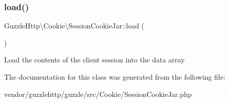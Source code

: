 \subsubsection{\texorpdfstring{load()}{load()}}
{\footnotesize\ttfamily Guzzle\+Http\textbackslash{}\+Cookie\textbackslash{}\+Session\+Cookie\+Jar\+::load (\begin{DoxyParamCaption}{ }\end{DoxyParamCaption})\hspace{0.3cm}{\ttfamily [protected]}}

Load the contents of the client session into the data array 

The documentation for this class was generated from the following file\+:\begin{DoxyCompactItemize}
\item 
vendor/guzzlehttp/guzzle/src/\+Cookie/Session\+Cookie\+Jar.\+php\end{DoxyCompactItemize}
